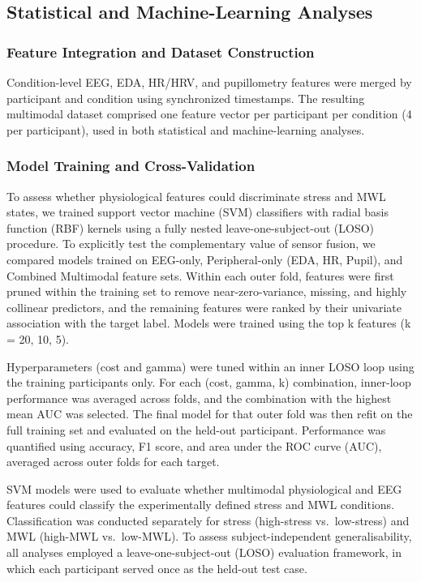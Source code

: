 \documentclass[lettersize,journal]{IEEEtran}
\begin{document}
\subsection{Statistical and Machine-Learning Analyses}

\subsubsection{Feature Integration and Dataset Construction}
Condition-level EEG, EDA, HR/HRV, and pupillometry features were merged by participant and condition using synchronized timestamps. The resulting multimodal dataset comprised one feature vector per participant per condition (4 per participant), used in both statistical and machine-learning analyses.

\subsubsection{Model Training and Cross-Validation}

To assess whether physiological features could discriminate stress and MWL states, we trained support vector machine (SVM) classifiers with radial basis function (RBF) kernels using a fully nested leave-one-subject-out (LOSO) procedure. 
To explicitly test the complementary value of sensor fusion, we compared models trained on EEG-only, Peripheral-only (EDA, HR, Pupil), and Combined Multimodal feature sets.
Within each outer fold, features were first pruned within the training set to remove near-zero-variance, missing, and highly collinear predictors, and the remaining features were ranked by their univariate association with the target label. Models were trained using the top k features (k = 20, 10, 5).

Hyperparameters (cost and gamma) were tuned within an inner LOSO loop using the training participants only. For each (cost, gamma, k) combination, inner-loop performance was averaged across folds, and the combination with the highest mean AUC was selected. The final model for that outer fold was then refit on the full training set and evaluated on the held-out participant. Performance was quantified using accuracy, F1 score, and area under the ROC curve (AUC), averaged across outer folds for each target.

SVM models were used to evaluate whether multimodal physiological and EEG features could classify the experimentally defined stress and MWL conditions. Classification was conducted separately for stress (high-stress vs.\ low-stress) and MWL (high-MWL vs.\ low-MWL). To assess subject-independent generalisability, all analyses employed a leave-one-subject-out (LOSO) evaluation framework, in which each participant served once as the held-out test case.
\end{document}
